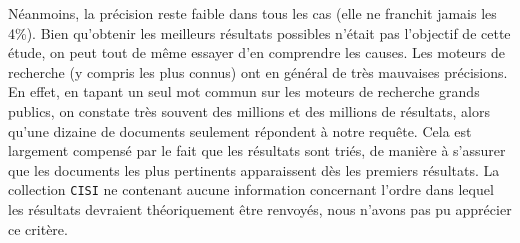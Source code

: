 Néanmoins, la précision reste faible dans tous les cas (elle ne franchit jamais les 4\%). Bien qu'obtenir les meilleurs résultats possibles n'était pas l'objectif de cette étude, on peut tout de même essayer d'en comprendre les causes. Les moteurs de recherche (y compris les plus connus) ont en général de très mauvaises précisions. En effet, en tapant un seul mot commun sur les moteurs de recherche grands publics, on constate très souvent des millions et des millions de résultats, alors qu'une dizaine de documents seulement répondent à notre requête. Cela est largement compensé par le fait que les résultats sont triés, de manière à s'assurer que les documents les plus pertinents apparaissent dès les premiers résultats. La collection \texttt{CISI} ne contenant aucune information concernant l'ordre dans lequel les résultats devraient théoriquement être renvoyés, nous n'avons pas pu apprécier ce critère.